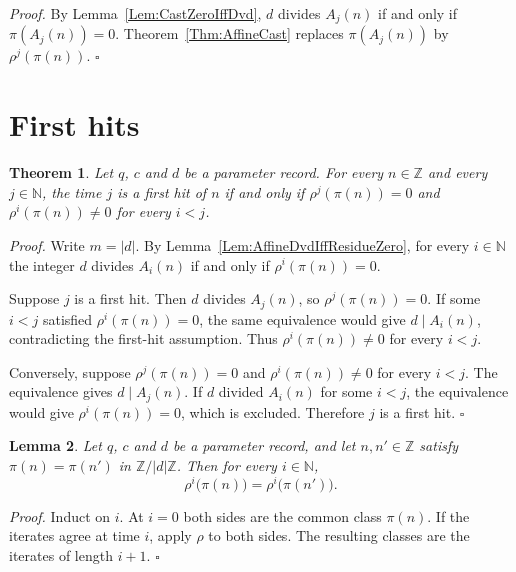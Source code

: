 \documentclass[11pt,letterpaper]{article}
\newcommand{\N}{\mathbb{N}}
\newcommand{\Z}{\mathbb{Z}}
\newtheorem{theorem}{Theorem}
\newtheorem{lemma}[theorem]{Lemma}
\newenvironment{proof}{\noindent\textit{Proof.}}{\hfill\(\square\)}
\begin{document}
\begin{proof}
By Lemma~\ref{Lem:CastZeroIffDvd}, \(d\) divides \(A_{j}(n)\) if and only if
\(\pi(A_{j}(n))=0\). Theorem~\ref{Thm:AffineCast} replaces
\(\pi(A_{j}(n))\) by \(\rho^{j}(\pi(n))\).
\end{proof}

\section{First hits}

\begin{theorem}\label{Thm:FirstHitIffResidue}
Let \(q\), \(c\) and \(d\) be a parameter record. For every \(n\in\Z\) and every
\(j\in\N\), the time \(j\) is a first hit of \(n\) if and only if
\(\rho^{j}(\pi(n))=0\) and \(\rho^{i}(\pi(n))\neq 0\) for every \(i<j\).
\end{theorem}

\begin{proof}
Write \(m=|d|\). By Lemma~\ref{Lem:AffineDvdIffResidueZero}, for every
\(i\in\N\) the integer \(d\) divides \(A_{i}(n)\) if and only if
\(\rho^{i}(\pi(n))=0\).

Suppose \(j\) is a first hit. Then \(d\) divides \(A_{j}(n)\), so
\(\rho^{j}(\pi(n))=0\). If some \(i<j\) satisfied \(\rho^{i}(\pi(n))=0\), the
same equivalence would give \(d\mid A_{i}(n)\), contradicting the first-hit
assumption. Thus \(\rho^{i}(\pi(n))\neq 0\) for every \(i<j\).

Conversely, suppose \(\rho^{j}(\pi(n))=0\) and \(\rho^{i}(\pi(n))\neq 0\) for
every \(i<j\). The equivalence gives \(d\mid A_{j}(n)\). If \(d\) divided
\(A_{i}(n)\) for some \(i<j\), the equivalence would give
\(\rho^{i}(\pi(n))=0\), which is excluded. Therefore \(j\) is a first hit.
\end{proof}

\begin{lemma}\label{Lem:ResidueIterateCongruent}
Let \(q\), \(c\) and \(d\) be a parameter record, and let \(n,n'\in\Z\) satisfy
\(\pi(n)=\pi(n')\) in \(\Z/|d|\Z\). Then for every \(i\in\N\),
\[
\rho^{i}\bigl(\pi(n)\bigr)=\rho^{i}\bigl(\pi(n')\bigr).
\]
\end{lemma}

\begin{proof}
Induct on \(i\). At \(i=0\) both sides are the common class \(\pi(n)\). If the
iterates agree at time \(i\), apply \(\rho\) to both sides. The resulting
classes are the iterates of length \(i+1\).
\end{proof}
\end{document}
